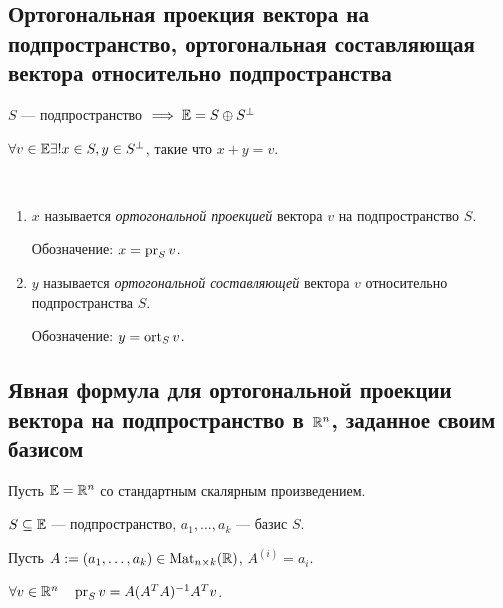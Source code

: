 \subsection{Ортогональная проекция вектора на подпространство, ортогональная составляющая вектора относительно подпространства}

$S$ --- подпространство $ \implies \mathbb{E} = S \oplus S^{\perp}$

$\forall v \in \mathbb{E} \exists! x \in S, y \in S^{\perp}$, такие что $x + y = v$.

\begin{definition}~
    \begin{enumerate}
    \item 
        $x$ называется \textit{ортогональной проекцией} вектора $v$ на подпространство $S$.

        Обозначение: $x = \operatorname{\mathop{\mathrm{pr}}}_S v$.

    \item
        $y$ называется \textit{ортогональной составляющей} вектора $v$ относительно подпространства $S$.

        Обозначение: $y = \operatorname{\mathop{\mathrm{ort}}}_S v$.
    \end{enumerate}
\end{definition}

\subsection{Явная формула для ортогональной проекции вектора на подпространство в $\mathbb{R}^n$, заданное своим базисом}

Пусть $\mathbb{E} = \mathbb{R}^n$ со стандартным скалярным произведением.

$S \subseteq \mathbb{E}$ --- подпространство, $a_1, \dots, a_k$ --- базис $S$.

Пусть $A := (a_1, \dots, a_k) \in \text{Mat}_{n \times k}(\mathbb{R})$, $A^{(i)} = a_i$.

\begin{proposal}
    $\forall v \in \mathbb{R}^n \quad \operatorname{\mathop{\mathrm{pr}}}_S v = A (A^{T} A)^{-1} A^{T} v$.
\end{proposal}

